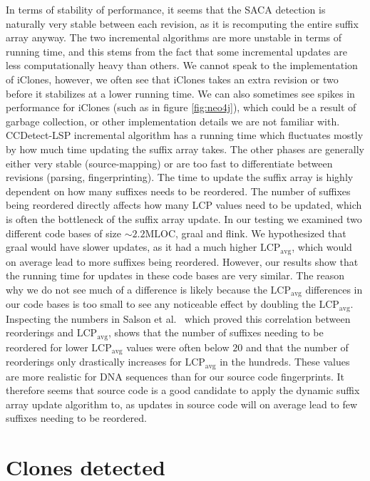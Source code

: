 In terms of stability of performance, it seems that the SACA detection is naturally very
stable between each revision, as it is recomputing the entire suffix array anyway. The two
incremental algorithms are more unstable in terms of running time, and this stems from the
fact that some incremental updates are less computationally heavy than others. We cannot
speak to the implementation of iClones, however, we often see that iClones takes an extra
revision or two before it stabilizes at a lower running time. We can also sometimes see
spikes in performance for iClones (such as in figure \ref{fig:neo4j}), which could be a
result of garbage collection, or other implementation details we are not familiar with.
CCDetect-LSP incremental algorithm has a running time which fluctuates mostly by how much
time updating the suffix array takes. The other phases are generally either very stable
(source-mapping) or are too fast to differentiate between revisions (parsing,
fingerprinting). The time to update the suffix array is highly dependent on how many
suffixes needs to be reordered. The number of suffixes being reordered directly affects
how many LCP values need to be updated, which is often the bottleneck of the suffix array
update. In our testing we examined two different code bases of size
${\sim}2.2\text{MLOC}$, graal and flink. We hypothesized that graal would have slower
updates, as it had a much higher $\text{LCP}_\text{avg}$, which would on average lead to
more suffixes being reordered. However, our results show that the running time for updates
in these code bases are very similar. The reason why we do not see much of a difference is
likely because the $\text{LCP}_\text{avg}$ differences in our code bases is too small to
see any noticeable effect by doubling the $\text{LCP}_\text{avg}$. Inspecting the numbers
in Salson et al.~\cite{DynamicExtendedSuffixArraysReorderings} which proved this
correlation between reorderings and $\text{LCP}_\text{avg}$, shows that the number of suffixes
needing to be reordered for lower $\text{LCP}_\text{avg}$ values were often below $20$ and
that the number of reorderings only drastically increases for $\text{LCP}_\text{avg}$ in
the hundreds. These values are more realistic for DNA sequences than for our source code
fingerprints. It therefore seems that source code is a good candidate to apply the dynamic
suffix array update algorithm to, as updates in source code will on average lead to few
suffixes needing to be reordered.

\section{Clones detected}

